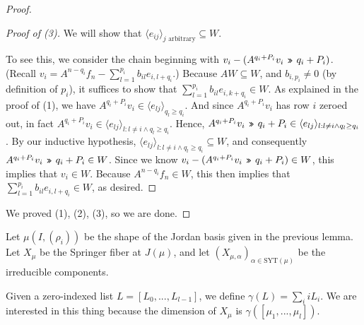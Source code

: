 \documentclass[12pt,psamsfonts]{article}
\newcommand{\leftshift}{\,\texttt{<<}\,}
\newcommand{\rightshift}{\mathbin{\rotatebox[origin=c]{180}{\leftshift}}}
\begin{document}
\begin{proof}
\begin{proof}[Proof of (3)]
        We will show that \(\langle e_{ij} \rangle_{j \textrm{ arbitrary}} \subseteq W\).
        \par To see this, we consider the chain beginning with \(v_i - (A^{q_i + P_i} v_i \rightshift q_i + P_i)\).
        (Recall \(v_i = A^{n - q_i} f_n - \sum_{l = 1}^{p_i} b_{il} e_{i,l + q_i}\).)
        Because \(AW \subseteq W\), and \(b_{i,p_i} \neq 0\) (by definition of \(p_i\)), it suffices to show that \(\sum_{l = 1}^{p_i} b_{il} e_{i,k + q_i} \in W\).
        As explained in the proof of (1), we have \(A^{q_i + P_i} v_i \in \langle e_{lj} \rangle_{q_l \geq q_i}\).
        And since \(A^{q_i + P_i} v_i\) has row \(i\) zeroed out, in fact \(A^{q_i + P_i} v_i \in \langle e_{lj} \rangle_{l : l \neq i \land q_l \geq q_i}\).
        Hence, \(A^{q_i + P_i} v_i \rightshift q_i + P_i \in \langle e_{lj} \rangle_{l : l \neq i \land q_l \geq q_i}\).
        By our inductive hypothesis, \(\langle e_{lj} \rangle_{l : l \neq i \land q_l \geq q_i} \subseteq W\), and consequently \(A^{q_i + P_i} v_i \rightshift q_i + P_i \in W\).
        Since we know \(v_i - (A^{q_i + P_i} v_i \rightshift q_i + P_i) \in W\), this implies that \(v_i \in W\).
        Because \(A^{n - q_i} f_n \in W\), this then implies that \(\sum_{l = 1}^{p_i} b_{il} e_{i,l + q_i} \in W\), as desired.
    \end{proof}
    We proved (1), (2), (3), so we are done.
\end{proof}

Let \(\mu(I, (\rho_i))\) be the shape of the Jordan basis given in the previous lemma.
Let \(X_\mu\) be the Springer fiber at \(J(\mu)\), and let \((X_{\mu, \alpha})_{\alpha \in \mathrm{SYT}(\mu)}\) be the irreducible components.
\par Given a zero-indexed list \(L = [L_0, ..., L_{l - 1}]\), we define \(\gamma(L) = \sum_i i L_i\).
We are interested in this thing because the dimension of \(X_\mu\) is \(\gamma([\mu_1, ..., \mu_l])\).
\end{document}
